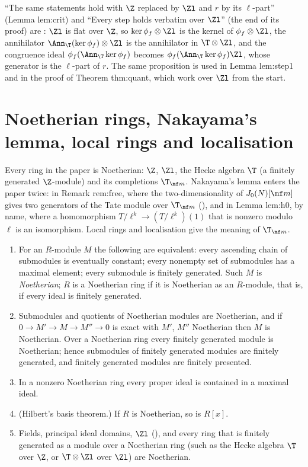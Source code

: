 \begin{paperlink}\label{pl:modules:flat}
``The same statements hold with $\Z$ replaced by $\Zl$ and $r$ by its $\ell$-part'' (Lemma lem:crit) and ``Every step holds verbatim over $\Zl$'' (the end of its proof) are
: $\Zl$ is flat over $\Z$, so $\ker\phi_f\otimes\Zl$ is the kernel of $\phi_f\otimes\Zl$, the annihilator
$\Ann_\T(\ker\phi_f)\otimes\Zl$ is the annihilator in $\T\otimes\Zl$, and the congruence ideal $\phi_f(\Ann_\T\ker\phi_f)$ becomes
$\phi_f(\Ann_\T\ker\phi_f)\Zl$, whose generator is the $\ell$-part of $r$. The same proposition is used in Lemma lem:step1 and in the proof of
Theorem thm:quant, which work over $\Zl$ from the start.
\end{paperlink}

\section[Noetherian rings, Nakayama, localisation]{Noetherian rings, Nakayama's lemma, local rings and localisation}\label{sec:modules:local}

Every ring in the paper is Noetherian: $\Z$, $\Zl$, the Hecke algebra $\T$ (a finitely generated $\Z$-module) and its
completions $\T_{\mf m}$. Nakayama's lemma enters the paper twice: in Remark rem:free, where the two-dimensionality of $J_0(N)[\mf m]$
gives two generators of the Tate module over $\T_{\mf m}$ (),
and in Lemma lem:h0, by name, where a homomorphism $T/\ell^k\to(T/\ell^k)(1)$ that is nonzero modulo $\ell$ is an isomorphism. Local rings
and localisation give the meaning of $\T_{\mf m}$.

\begin{proposition}\label{prop:modules:noetherian}
\begin{enumerate}[label=(\roman*)]
\item For an $R$-module $M$ the following are equivalent: every ascending chain of submodules is eventually constant; every
nonempty set of submodules has a maximal element; every submodule is finitely generated. Such $M$ is \emph{Noetherian}; $R$
is a Noetherian ring if it is Noetherian as an $R$-module, that is, if every ideal is finitely generated.
\item Submodules and quotients of Noetherian modules are Noetherian, and if $0\to M'\to M\to M''\to0$ is exact with $M'$, $M''$
Noetherian then $M$ is Noetherian. Over a Noetherian ring every finitely generated module is Noetherian; hence submodules of
finitely generated modules are finitely generated, and finitely generated modules are finitely presented.
\item In a nonzero Noetherian ring every proper ideal is contained in a maximal ideal.
\item (Hilbert's basis theorem.) If $R$ is Noetherian, so is $R[x]$.
\item Fields, principal ideal domains, $\Zl$ (), and every ring that is finitely generated as a module over a
Noetherian ring (such as the Hecke algebra $\T$ over $\Z$, or $\T\otimes\Zl$ over $\Zl$) are Noetherian.
\end{enumerate}
\end{proposition}

